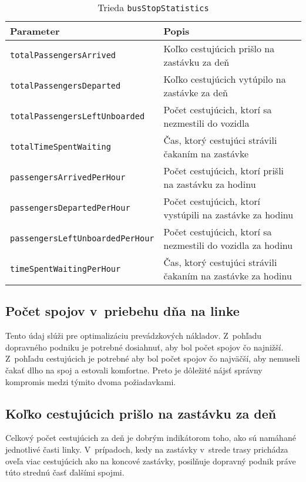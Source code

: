 \begin{table}[h]\label{tab:busStopStatistics_class}
  \centering
  \begin{tabularx}{\textwidth}{|l|X|}
    \hline
    \textbf{Parameter} & \textbf{Popis} \\ \hline
    \texttt{totalPassengersArrived} & Koľko cestujúcich prišlo na zastávku za deň \\ \hline
    \texttt{totalPassengersDeparted} & Koľko cestujúcich vytúpilo na zastávke za deň \\ \hline
    \texttt{totalPassengersLeftUnboarded} & Počet cestujúcich, ktorí sa nezmestili do vozidla \\ \hline
    \texttt{totalTimeSpentWaiting} & Čas, ktorý cestujúci strávili čakaním na zastávke \\ \hline
    \texttt{passengersArrivedPerHour} & Počet cestujúcich, ktorí prišli na zastávku za hodinu \\ \hline
    \texttt{passengersDepartedPerHour} & Počet cestujúcich, ktorí vystúpili na zastávke za hodinu \\ \hline
    \texttt{passengersLeftUnboardedPerHour} & Počet cestujúcich, ktorí sa nezmestili do vozidla za hodinu \\ \hline
    \texttt{timeSpentWaitingPerHour} & Čas, ktorý cestujúci strávili čakaním na zastávke za hodinu \\ \hline
  \end{tabularx}
  \caption{Trieda \texttt{busStopStatistics}}
\end{table}

\subsection*{Počet spojov v~priebehu dňa na linke}
Tento údaj slúži pre optimalizáciu prevádzkových nákladov. Z~pohľadu dopravného podniku je potrebné dosiahnuť, aby bol počet spojov čo najnižší.
Z~pohľadu cestujúcich je potrebné aby bol počet spojov čo najväčší, aby nemuseli čakať dlho na spoj a estovali komfortne.
Preto je dôležité nájsť správny kompromis medzi týmito dvoma požiadavkami.

\subsection*{Koľko cestujúcich prišlo na zastávku za deň}
Celkový počet cestujúcich za deň je dobrým indikátorom toho, ako sú namáhané jednotlivé časti linky.
V~prípadoch, kedy na zastávky v~strede trasy prichádza oveľa viac cestujúcich ako na koncové zastávky, posilňuje dopravný podnik práve túto strednú časť ďalšími spojmi.

